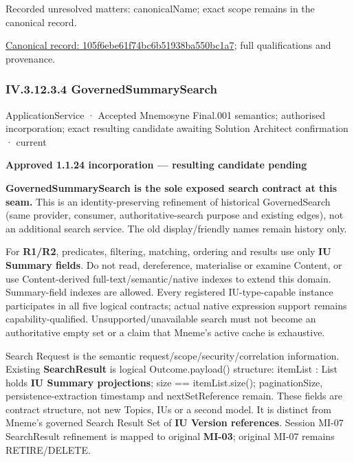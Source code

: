 {\small Recorded unresolved matters: canonicalName; exact scope remains in the canonical record.}\par
{\footnotesize \href{../../../../../../../continuum/application/application-service/105f6ebe61f74bc6b51938ba550bc1a7.md}{Canonical record: 105f6ebe61f74bc6b51938ba550bc1a7}; full qualifications and provenance.}\par
\subsubsection*{IV.3.12.3.4 GovernedSummarySearch}
\label{navigation:IV.3.12.3.4}

\label{element:dcb31810ae134818adeeba9b27bd2f30}
{\small ApplicationService · Accepted Mnemosyne Final.001 semantics; authorised incorporation; exact resulting candidate awaiting Solution Architect confirmation · current}\par

\par\medskip\textbf{Approved 1.1.24 incorporation — resulting candidate pending}\par


\textbf{GovernedSummarySearch is the sole exposed search contract at this seam.} This is an identity-preserving refinement of historical GovernedSearch (same provider, consumer, authoritative-search purpose and existing edges), not an additional search service. The old display/friendly names remain history only.



For \textbf{R1/R2}, predicates, filtering, matching, ordering and results use only \textbf{IU Summary fields}. Do not read, dereference, materialise or examine Content, or use Content-derived full-text/semantic/native indexes to extend this domain. Summary-field indexes are allowed. Every registered IU-type-capable instance participates in all five logical contracts; actual native expression support remains capability-qualified. Unsupported/unavailable search must not become an authoritative empty set or a claim that Mneme's active cache is exhaustive.



Search Request is the semantic request/scope/security/correlation information. Existing \textbf{SearchResult} is logical Outcome.payload() structure: itemList : List holds \textbf{IU Summary projections}; size == itemList.size(); paginationSize, persistence-extraction timestamp and nextSetReference remain. These fields are contract structure, not new Topics, IUs or a second model. It is distinct from Mneme's governed Search Result Set of \textbf{IU Version references}. Session MI-07 SearchResult refinement is mapped to original \textbf{MI-03}; original MI-07 remains RETIRE/DELETE.



